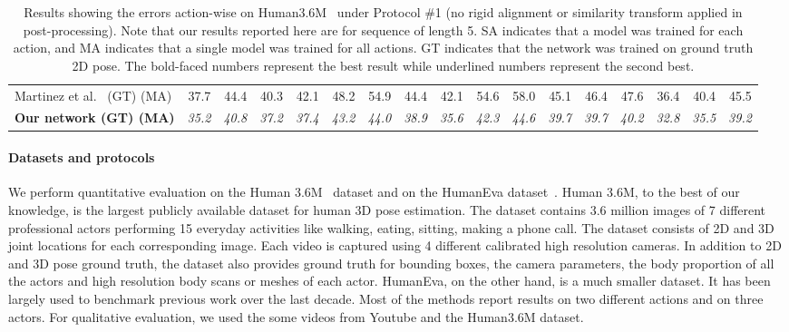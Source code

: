 \documentclass[runningheads]{llncs}
\begin{document}
\begin{table}
{\begin{tabular}{@{}lrrrrrrrrrrrrrrrr@{}}
\hline
Martinez et al.~\cite{JMartinez:ICCV:2017} (GT) (MA) & 37.7& 	44.4& 	40.3& 	42.1& 	48.2& 	54.9& 	44.4& 	42.1& 	54.6& 	58.0& 	45.1& 	46.4& 	47.6& 	36.4& 	40.4& 	45.5\\
\textbf{Our network (GT) (MA)} & \it{35.2}&  \it{40.8}&	\it{37.2}&	\it{37.4}&	\it{43.2}&	\it{44.0}&	\it{38.9}&	\it{35.6}&	\it{42.3}&	\it{44.6}&	\it{39.7}&	\it{39.7}&	\it{40.2}&	\it{32.8}&	\it{35.5}&	\it{39.2}\\
\hline
\end{tabular}}
\vspace{3mm}
\caption{Results showing the errors action-wise on Human3.6M~\cite{h36m_pami} under Protocol \#1 (no rigid alignment or similarity transform applied in post-processing). Note that our results reported here are for sequence of length 5. SA indicates that a model was trained for each action, and MA indicates that a single model was trained for all actions. GT indicates that the network was trained on ground truth 2D pose. The bold-faced numbers represent the best result while underlined numbers represent the second best.}
\label{tab:protocol_1}
\vspace{-5mm}
\end{table}




\paragraph{Datasets and protocols} 

We perform quantitative evaluation on the Human 3.6M~\cite{h36m_pami} dataset and on the HumanEva dataset~\cite{heva}. Human 3.6M, to the best of our knowledge, is the largest publicly available dataset for human 3D pose estimation. The dataset contains 3.6 million images of 7 different professional actors performing 15 everyday activities like walking, eating, sitting, making a phone call. The dataset consists of 2D and 3D joint locations for each corresponding image. Each video is captured using 4 different calibrated high resolution cameras. In addition to 2D and 3D pose ground truth, the dataset also provides ground truth for bounding boxes, the camera parameters, the body proportion of all the actors and high resolution body scans or meshes of each actor. HumanEva, on the other hand, is a much smaller dataset. It has been largely used to benchmark previous work over the last decade. Most of the methods report results on two different actions and on three actors. For qualitative evaluation, we used the some videos from Youtube and the Human3.6M dataset.
\end{document}
